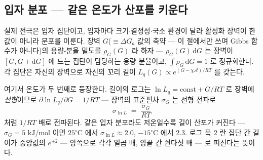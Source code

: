 \documentclass[11pt,a4paper]{article}
\newcommand{\dd}{\mathrm{d}}
\begin{document}
\subsection{입자 분포 — 같은 온도가 산포를 키운다}
실제 전극은 입자 집단이고, 입자마다 크기$\cdot$결정성$\cdot$국소 환경이 달라 활성화 장벽이 한 값이 아니라
분포를 이룬다. 장벽 $G$($\equiv\Delta G_{a}$ 값의 축약 — 이 절에서만 쓰며 Gibbs 함수가 아니다)의
용량-분율 밀도를 $\rho_G(G)$ 라 하자 — $\rho_G(G)\,\dd G$ 는 장벽이
$[G,G+\dd G]$ 에 드는 집단이 담당하는 용량 분율이고, $\int\rho_G\,\dd G=1$ 로 정규화한다. 각 집단은
자신의 장벽으로 자신의 꼬리 길이 $L_q(G)\propto e^{(G-\chi\mathcal A)/RT}$ 를 갖는다.

여기서 온도가 두 번째로 등장한다. 길이의 로그는 $\ln L_q=\text{const}+G/RT$ 로 장벽에
\emph{선형}이므로 $\partial\ln L_q/\partial G=1/RT$ — 장벽의 표준편차 $\sigma_G$ 는 선형 전파로
\begin{equation}
\sigma_{\ln L}\;=\;\frac{\sigma_G}{RT}
\label{eq:varprop}
\end{equation}
처럼 $1/RT$ 배로 전파된다. 같은 입자 분포라도 저온일수록 길이 산포가 커진다 — $\sigma_G=5$ kJ/mol 이면
$25^\circ$C 에서 $\sigma_{\ln L}\approx2.0$, $-15^\circ$C 에서 $2.3$. 로그 폭 $2$ 란 집단 간 길이가 중앙값의
$e^{\pm2}$ — 양쪽으로 각각 일곱 배, 양끝 간 쉰다섯 배 — 로 퍼진다는 뜻이다.
\end{document}
